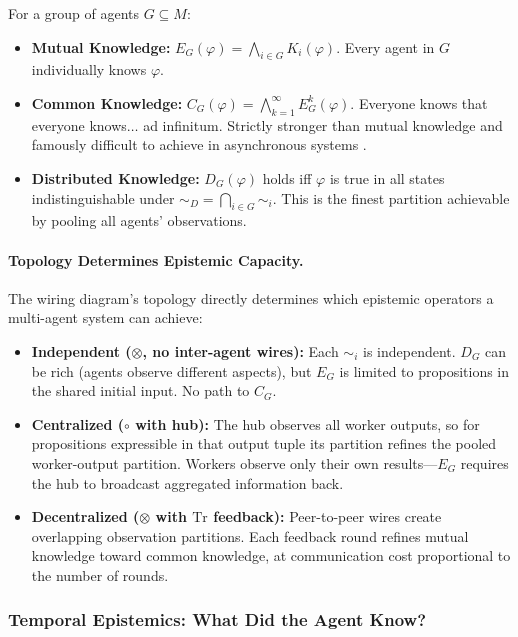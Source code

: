 \begin{definition}
\label{def:group-epistemic-operators}
For a group of agents $G \subseteq M$:
\begin{itemize}[leftmargin=*]
\item \textbf{Mutual Knowledge:} $E_G(\varphi) = \bigwedge_{i \in G} K_i(\varphi)$. Every agent in $G$ individually knows $\varphi$.
\item \textbf{Common Knowledge:} $C_G(\varphi) = \bigwedge_{k=1}^{\infty} E_G^k(\varphi)$. Everyone knows that everyone knows$\ldots$ ad infinitum. Strictly stronger than mutual knowledge and famously difficult to achieve in asynchronous systems \cite{halpern1990knowledge}.
\item \textbf{Distributed Knowledge:} $D_G(\varphi)$ holds iff $\varphi$ is true in all states indistinguishable under $\sim_D = \bigcap_{i \in G} \sim_i$. This is the finest partition achievable by pooling all agents' observations.
\end{itemize}
\end{definition}

\paragraph{Topology Determines Epistemic Capacity.}
The wiring diagram's topology directly determines which epistemic operators a multi-agent system can achieve:
\begin{itemize}[leftmargin=*]
\item \textbf{Independent ($\otimes$, no inter-agent wires):} Each $\sim_i$ is independent. $D_G$ can be rich (agents observe different aspects), but $E_G$ is limited to propositions in the shared initial input. No path to $C_G$.
\item \textbf{Centralized ($\circ$ with hub):} The hub observes all worker outputs, so for propositions expressible in that output tuple its partition refines the pooled worker-output partition. Workers observe only their own results---$E_G$ requires the hub to broadcast aggregated information back.
\item \textbf{Decentralized ($\otimes$ with $\mathrm{Tr}$ feedback):} Peer-to-peer wires create overlapping observation partitions. Each feedback round refines mutual knowledge toward common knowledge, at communication cost proportional to the number of rounds.
\end{itemize}

\subsubsection{Temporal Epistemics: What Did the Agent Know?}


